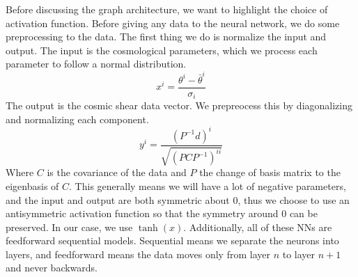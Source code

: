 Before discussing the graph architecture, we want to highlight the choice of activation function. Before giving any data to the neural network, we do some preprocessing to the data. The first thing we do is normalize the input and output. The input is the cosmological parameters, which we process each parameter to follow a normal distribution.
\begin{equation}
	x^i = \frac{\theta^i - \bar\theta^i}{\sigma_i}
\end{equation}
The output is the cosmic shear data vector. We prepreocess this by diagonalizing and normalizing each component.
\begin{equation}
	y^i = \frac{ (P^{-1}d)^i }{\sqrt{(PCP^{-1})^{ii}}}
\end{equation}
Where $C$ is the covariance of the data and $P$ the change of basis matrix to the eigenbasis of $C$. This generally means we will have a lot of negative parameters, and the input and output are both symmetric about 0, thus we choose to use an antisymmetric activation function so that the symmetry around 0 can be preserved. In our case, we use $\tanh(x)$. Additionally, all of these NNs are feedforward sequential models. Sequential means we separate the neurons into layers, and feedforward means the data moves only from layer $n$ to layer $n+1$ and never backwards.
